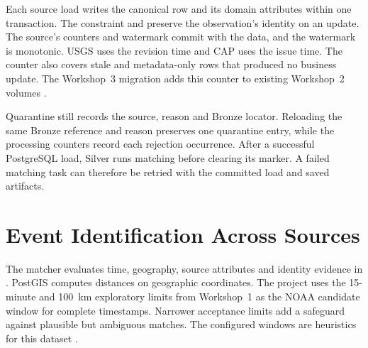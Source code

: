 \documentclass[a4paper,11pt,oneside]{book}
\begin{document}
Each source load writes the canonical  row and its domain attributes within one transaction. The  constraint and  preserve the observation's identity on an update. The source's counters and watermark commit with the data, and the watermark is monotonic. USGS uses the revision time and CAP uses the issue time. The counter  also covers stale and metadata-only rows that produced no business update. The Workshop~3 migration adds this counter to existing Workshop~2 volumes \cite{postgresql}.

Quarantine still records the source, reason and Bronze locator. Reloading the same Bronze reference and reason preserves one quarantine entry, while the processing counters record each rejection occurrence. After a successful PostgreSQL load, Silver runs matching before clearing its marker. A failed matching task can therefore be retried with the committed load and saved artifacts.

\section{Event Identification Across Sources}
The matcher evaluates time, geography, source attributes and identity evidence in . PostGIS computes distances on geographic coordinates. The project uses the 15-minute and 100~km exploratory limits from Workshop~1 as the NOAA candidate window for complete timestamps. Narrower acceptance limits add a safeguard against plausible but ambiguous matches. The configured windows are heuristics for this dataset \cite{workshop1,postgis-distance}.
\end{document}
